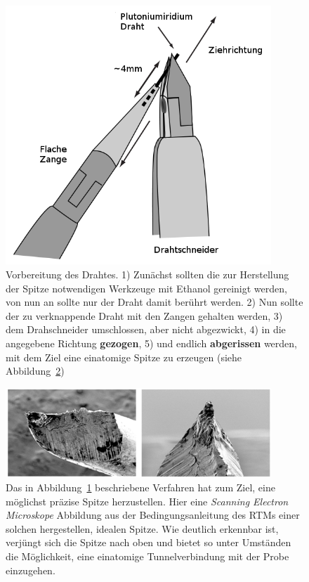 \begin{figure}
\includegraphics[width=10cm]{pics/prepare_tip2}
\caption{Vorbereitung des Drahtes. 1) Zunächst sollten die
zur Herstellung der Spitze notwendigen Werkzeuge mit Ethanol
gereinigt werden, von nun an sollte nur der Draht damit berührt 
werden. 2) Nun sollte der zu verknappende Draht mit den Zangen
gehalten werden, 3) dem Drahschneider umschlossen, aber nicht
abgezwickt, 4) in die angegebene Richtung \textbf{gezogen}, 5)
und endlich \textbf{abgerissen} werden, mit dem Ziel eine 
einatomige Spitze zu erzeugen (siehe Abbildung~\ref{fig:SEM_tip_picture})}
 \label{fig:prepare_tip}
\end{figure}

\begin{figure}
\includegraphics[width=10cm]{pics/SEM_tip_picture}
\caption{Das in Abbildung~\ref{fig:prepare_tip} beschriebene
Verfahren hat zum Ziel, eine möglichst präzise Spitze herzustellen.
Hier eine \textit{Scanning Electron Microskope} Abbildung
aus der Bedingungsanleitung des RTMs 
einer solchen hergestellen, idealen Spitze. Wie deutlich erkennbar
ist, verjüngt sich die Spitze nach oben und bietet so unter 
Umständen die Möglichkeit, eine einatomige Tunnelverbindung
mit der Probe einzugehen.}
 \label{fig:SEM_tip_picture}
\end{figure}
